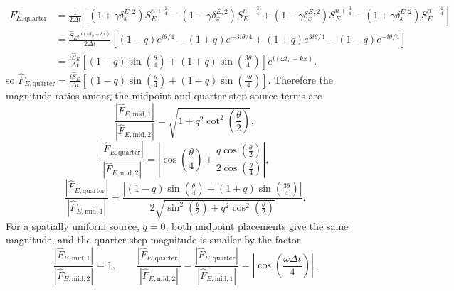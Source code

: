 \documentclass{article}
\numberwithin{figure}{section}
\begin{document}
\begin{equation}
    \begin{aligned} F_{E,\mathrm{quarter}}^n & =\frac{1}{2\Delta t}\left[\left(1+\gamma\delta_x^{E,2}\right)S_E^{n+\frac{1}{4}}-\left(1-\gamma\delta_x^{E,2}\right)S_E^{n-\frac{3}{4}}+\left(1-\gamma\delta_x^{E,2}\right)S_E^{n+\frac{3}{4}}-\left(1+\gamma\delta_x^{E,2}\right)S_E^{n-\frac{1}{4}}\right] \\
                                       & =\frac{\widehat{S}_Ee^{i(\omega t_n-kx)}}{2\Delta t}\left[\left(1-q\right)e^{i\theta/4}-\left(1+q\right)e^{-3i\theta/4}+\left(1+q\right)e^{3i\theta/4}-\left(1-q\right)e^{-i\theta/4}\right]                                                           \\
                                       & =\frac{i\widehat{S}_E}{\Delta t}\left[\left(1-q\right)\sin\left(\frac{\theta}{4}\right)+\left(1+q\right)\sin\left(\frac{3\theta}{4}\right)\right]e^{i(\omega t_n-kx)}.
    \end{aligned} \label{eq:quarter-source-amplitude}
\end{equation}
so $\widehat{F}_{E,\mathrm{quarter}}=\frac{i\widehat{S}_E}{\Delta t}\left[\left(1-q\right)\sin\left(\frac{\theta}{4}\right)+\left(1+q\right)\sin\left(\frac{3\theta}{4}\right)\right]$.
Therefore the magnitude ratios among the midpoint and quarter-step source terms are
\begin{equation}
    \frac{\left|\widehat{F}_{E,\mathrm{mid,1}}\right|}{\left|\widehat{F}_{E,\mathrm{mid,2}}\right|}=\sqrt{1+q^{2}\cot^{2}\left(\frac{\theta}{2}\right)}, \label{eq:source-magnitude-ratio-mid}
\end{equation}
\begin{equation}
    \frac{\left|\widehat{F}_{E,\mathrm{quarter}}\right|}{\left|\widehat{F}_{E,\mathrm{mid,2}}\right|}=\left|\cos\left(\frac{\theta}{4}\right)+\frac{q\cos\left(\frac{\theta}{2}\right)}{2\cos\left(\frac{\theta}{4}\right)}\right|, \label{eq:source-magnitude-ratio-both}
\end{equation}
\begin{equation}
    \frac{\left|\widehat{F}_{E,\mathrm{quarter}}\right|}{\left|\widehat{F}_{E,\mathrm{mid,1}}\right|}=\frac{\left|\left(1-q\right)\sin\left(\frac{\theta}{4}\right)+\left(1+q\right)\sin\left(\frac{3\theta}{4}\right)\right|}{2\sqrt{\sin^{2}\left(\frac{\theta}{2}\right)+q^{2}\cos^{2}\left(\frac{\theta}{2}\right)}}. \label{eq:source-magnitude-ratio}
\end{equation}
For a spatially uniform source, $q=0$, both midpoint placements give the same magnitude, and the quarter-step magnitude is smaller by the factor
\begin{equation}
    \frac{\left|\widehat{F}_{E,\mathrm{mid,1}}\right|}{\left|\widehat{F}_{E,\mathrm{mid,2}}\right|}=1,\qquad
    \frac{\left|\widehat{F}_{E,\mathrm{quarter}}\right|}{\left|\widehat{F}_{E,\mathrm{mid,2}}\right|}=\frac{\left|\widehat{F}_{E,\mathrm{quarter}}\right|}{\left|\widehat{F}_{E,\mathrm{mid,1}}\right|}=\left|\cos\left(\frac{\omega\Delta t}{4}\right)\right|. \label{eq:uniform-source-magnitude-ratio}
\end{equation}
\end{document}
